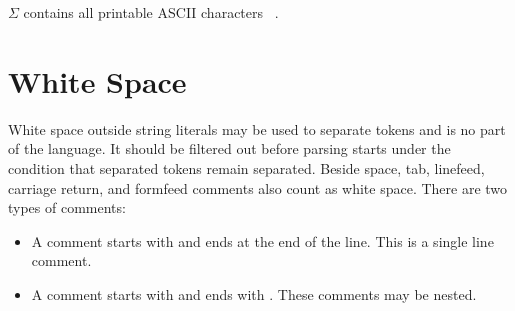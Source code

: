 \noindent
$\Sigma$ contains all printable ASCII characters \T{ } \class\ \T{\~{}}.

\section{White Space}

White space outside string literals may be used to separate tokens and is no
part of the language. It should be filtered out before parsing starts under
the condition that separated tokens remain separated. Beside space, tab,
linefeed, carriage return, and formfeed comments also count as white space.
There are two types of comments:
\begin{itemize}
\item A comment starts with \T{//} and ends at the end of the line. This is a
	single line comment.
\item A comment starts with \T{/*} and ends with \T{*/}. These comments may
	be nested.
\end{itemize}
